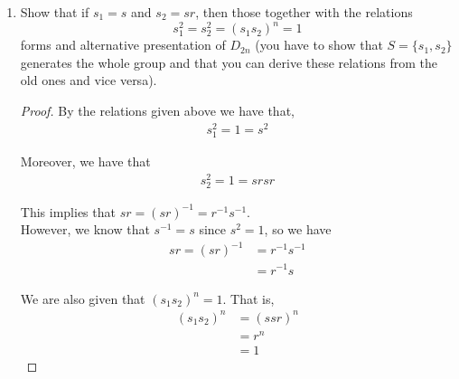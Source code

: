 \documentclass[11pt, reqno]{amsart}
\theoremstyle{plain}
\theoremstyle{definition}
\theoremstyle{example}
\begin{document}
\begin{enumerate}[1.]
\begin{enumerate}
\begin{proof}
as required.\\

Now we will compute the order of (3):
\begin{align*}
x^2 &= sr^ksr^k\\
&= sr^kr^{-k}s\\
&= s(r^kr^{-k})s\\
&= ss\\
&= 1
\end{align*}

and of (4):
\begin{align*}
x^2 &= r^ksr^ks\\
&= r^kr^{-k}ss\\
&= (r^kr^{-k})(ss)\\
&= 1
\end{align*}

So in either case, $|x| = 2$.\\

Note that the second line of both of the above equations was derived by repeatedly applying the relation $sr = r^{-1}s$
\end{proof}	
	
\item Show that if $s_1 =  s$ and $s_2 = sr$, then those together with the relations 
$$s_1^2 = s_2^2 = (s_1s_2)^n = 1$$
forms and alternative presentation of $D_{2n}$ (you have to show that $S=\{s_1, s_2\}$ generates the whole group and that you can derive these relations from the old ones and vice versa). 

\begin{proof}
By the relations given above we have that,
\begin{align*}
s_1^2 = 1 = s^2
\end{align*}

Moreover, we have that
\begin{align*}
s_2^2 = 1 = srsr
\end{align*}

This implies that $sr = (sr)^{-1} = r^{-1}s^{-1}$.\\

However, we know that $s^{-1} = s$ since $s^2 = 1$, so we have
\begin{align*}
sr = (sr)^{-1} &= r^{-1}s^{-1}\\
&= r^{-1}s
\end{align*}

We are also given that $(s_1s_2)^n = 1$. That is,
\begin{align*}
(s_1s_2)^n &= (ssr)^n\\
&= r^n\\
&= 1
\end{align*}


\end{proof}
\end{enumerate}
\end{enumerate}
\end{document}
